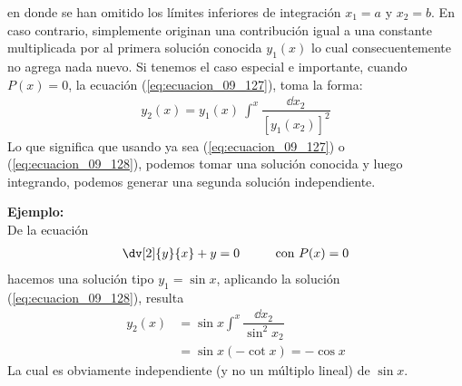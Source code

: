 en donde se han omitido los límites inferiores de integración $x_{1} = a$ y $x_{2}=b$. En caso contrario, simplemente originan una contribución igual a una constante multiplicada por al primera solución conocida $y_{1}(x)$ lo cual consecuentemente no agrega nada nuevo.
Si tenemos el caso especial e importante, cuando $P(x) = 0$, la ecuación (\ref{eq:ecuacion_09_127}), toma la forma:
\begin{align}
y_{2}(x) =  y_{1}(x) \: \int^{x} \dfrac{\dd{x_{2}}}{[y_{1}(x_{2})]^{2}}
\label{eq:ecuacion_09_128}
\end{align}
Lo que significa que usando ya sea (\ref{eq:ecuacion_09_127}) o (\ref{eq:ecuacion_09_128}), podemos tomar una solución conocida y luego integrando, podemos generar una segunda solución independiente.
\par
\textbf{Ejemplo: } \\
De la ecuación
\begin{align*}
\dv[2]{y}{x} + y = 0 \hspace{1cm} \mbox{con } P(x) = 0
\end{align*}
hacemos una solución tipo $y_{1} = \sin x$, aplicando la solución (\ref{eq:ecuacion_09_128}), resulta
\begin{align*}
y_{2}(x) &= \sin x \int^{x} \dfrac{\dd{x_{2}}}{\sin^{2} x_{2}} \\
&= \sin x (-\cot x) = - \cos x
\end{align*}
La cual es obviamente independiente (y no un múltiplo lineal) de $\sin x$.

